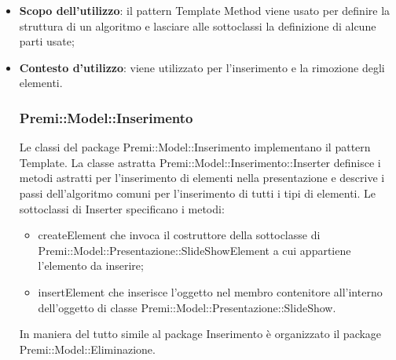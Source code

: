 {{\begin{itemize}
			Prima viene creata una classe che fornisce i passi base di un algoritmo. Questi passi sono implementati usando metodi astratti. Successivamente, le sottoclassi cambiano i metodi astratti per implementare l'algoritmo. Così facendo l'algoritmo generale è mantenuto valido, ma i passi concreti possono essere cambiati dalle sottoclassi.\\
			
			Template Method viene utilizzato frequentemente nei linguaggi orientati agli oggetti. Quando si ricorre al polimorfismo in generale, questo design pattern potrebbe essere definito come sua naturale conseguenza. Questo perché un metodo che invoca una funzione astratta o polimorfa è semplicemente il motivo d'essere del metodo astratto o polimorfo;\\
			\item \textbf{Scopo dell’utilizzo}: il pattern Template Method viene usato per definire la struttura di un algoritmo e lasciare alle sottoclassi la definizione di alcune parti usate;
			\item \textbf{Contesto d’utilizzo}: viene utilizzato per l’inserimento e la rimozione degli elementi.
			\subsubsection{Premi::Model::Inserimento}{
				Le classi del package Premi::Model::Inserimento implementano il pattern Template. La classe astratta Premi::Model::Inserimento::Inserter definisce i metodi astratti per l'inserimento di elementi nella presentazione e descrive i passi dell'algoritmo comuni per l'inserimento di tutti i tipi di elementi.
				Le sottoclassi di Inserter specificano i metodi:
				\begin{itemize}
					\item createElement che invoca il costruttore della sottoclasse di Premi::Model::Presentazione::SlideShowElement a cui appartiene l'elemento da inserire;
					\item insertElement che inserisce l'oggetto nel membro contenitore all'interno dell'oggetto di classe Premi::Model::Presentazione::SlideShow.
				\end{itemize} 
			}
			In maniera del tutto simile al package Inserimento è organizzato il package Premi::Model::Eliminazione.
		\end{itemize}
	}
}

